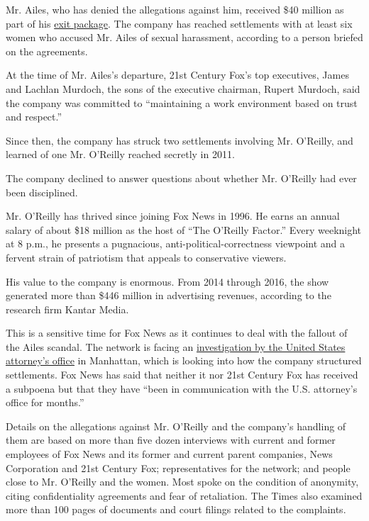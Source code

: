 Mr. Ailes, who has denied the allegations against him, received \$40
million as part of his
\href{https://www.nytimes3xbfgragh.onion/2016/07/22/business/media/roger-ailes-fox-news.html}{exit
package}. The company has reached settlements with at least six women
who accused Mr. Ailes of sexual harassment, according to a person
briefed on the agreements.

At the time of Mr. Ailes's departure, 21st Century Fox's top executives,
James and Lachlan Murdoch, the sons of the executive chairman, Rupert
Murdoch, said the company was committed to ``maintaining a work
environment based on trust and respect.''

Since then, the company has struck two settlements involving Mr.
O'Reilly, and learned of one Mr. O'Reilly reached secretly in 2011.

The company declined to answer questions about whether Mr. O'Reilly had
ever been disciplined.

Mr. O'Reilly has thrived since joining Fox News in 1996. He earns an
annual salary of about \$18 million as the host of ``The O'Reilly
Factor.'' Every weeknight at 8 p.m., he presents a pugnacious,
anti-political-correctness viewpoint and a fervent strain of patriotism
that appeals to conservative viewers.

His value to the company is enormous. From 2014 through 2016, the show
generated more than \$446 million in advertising revenues, according to
the research firm Kantar Media.

This is a sensitive time for Fox News as it continues to deal with the
fallout of the Ailes scandal. The network is facing an
\href{https://www.nytimes3xbfgragh.onion/2017/02/15/business/media/fox-news-sexual-harassment-payments.html}{investigation
by the United States attorney's office} in Manhattan, which is looking
into how the company structured settlements. Fox News has said that
neither it nor 21st Century Fox has received a subpoena but that they
have ``been in communication with the U.S. attorney's office for
months.''

Details on the allegations against Mr. O'Reilly and the company's
handling of them are based on more than five dozen interviews with
current and former employees of Fox News and its former and current
parent companies, News Corporation and 21st Century Fox; representatives
for the network; and people close to Mr. O'Reilly and the women. Most
spoke on the condition of anonymity, citing confidentiality agreements
and fear of retaliation. The Times also examined more than 100 pages of
documents and court filings related to the complaints.

